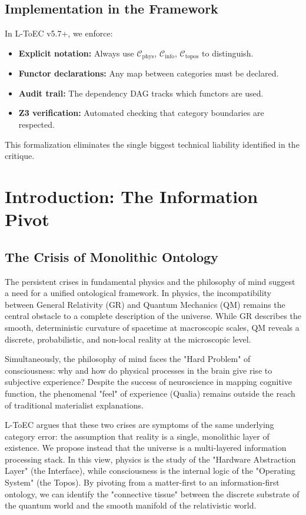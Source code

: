 \documentclass[11pt,titlepage]{article}
\newcommand{\Cphys}{\mathcal{C}_{\mathrm{phys}}}
\newcommand{\Cinfo}{\mathcal{C}_{\mathrm{info}}}
\newcommand{\Ctopos}{\mathcal{C}_{\mathrm{topos}}}
\begin{document}
\subsection{Implementation in the Framework}

In L-ToEC v5.7+, we enforce:
\begin{itemize}
    \item \textbf{Explicit notation:} Always use $\Cphys$, $\Cinfo$, $\Ctopos$ to distinguish.
    \item \textbf{Functor declarations:} Any map between categories must be declared.
    \item \textbf{Audit trail:} The dependency DAG tracks which functors are used.
    \item \textbf{Z3 verification:} Automated checking that category boundaries are respected.
\end{itemize}

This formalization eliminates the single biggest technical liability identified in the critique.
\section{Introduction: The Information Pivot}

\subsection{The Crisis of Monolithic Ontology}
The persistent crises in fundamental physics and the philosophy of mind suggest a need for a unified ontological framework. In physics, the incompatibility between General Relativity (GR) and Quantum Mechanics (QM) remains the central obstacle to a complete description of the universe. While GR describes the smooth, deterministic curvature of spacetime at macroscopic scales, QM reveals a discrete, probabilistic, and non-local reality at the microscopic level.

Simultaneously, the philosophy of mind faces the "Hard Problem" of consciousness: why and how do physical processes in the brain give rise to subjective experience? Despite the success of neuroscience in mapping cognitive function, the phenomenal "feel" of experience (Qualia) remains outside the reach of traditional materialist explanations.

L-ToEC argues that these two crises are symptoms of the same underlying category error: the assumption that reality is a single, monolithic layer of existence. We propose instead that the universe is a multi-layered information processing stack. In this view, physics is the study of the "Hardware Abstraction Layer" (the Interface), while consciousness is the internal logic of the "Operating System" (the Topos). By pivoting from a matter-first to an information-first ontology, we can identify the "connective tissue" between the discrete substrate of the quantum world and the smooth manifold of the relativistic world.
\end{document}
